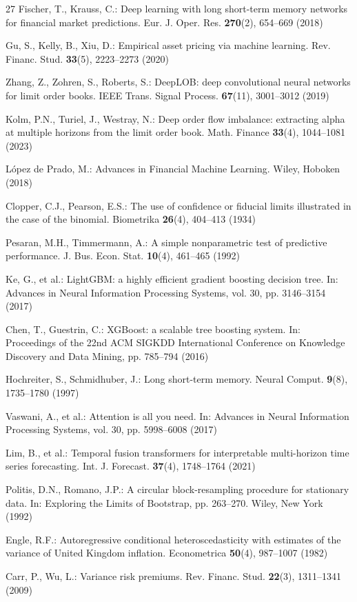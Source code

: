 \documentclass[runningheads]{llncs}
\begin{document}
\begin{thebibliography}{27}
Fischer, T., Krauss, C.: Deep learning with long short-term memory networks for
financial market predictions. Eur. J. Oper. Res. \textbf{270}(2), 654--669
(2018)

Gu, S., Kelly, B., Xiu, D.: Empirical asset pricing via machine learning. Rev.
Financ. Stud. \textbf{33}(5), 2223--2273 (2020)

Zhang, Z., Zohren, S., Roberts, S.: DeepLOB: deep convolutional neural networks
for limit order books. IEEE Trans. Signal Process. \textbf{67}(11), 3001--3012
(2019)

Kolm, P.N., Turiel, J., Westray, N.: Deep order flow imbalance: extracting alpha
at multiple horizons from the limit order book. Math. Finance \textbf{33}(4),
1044--1081 (2023)

L\'opez de Prado, M.: Advances in Financial Machine Learning. Wiley, Hoboken
(2018)

Clopper, C.J., Pearson, E.S.: The use of confidence or fiducial limits
illustrated in the case of the binomial. Biometrika \textbf{26}(4), 404--413
(1934)

Pesaran, M.H., Timmermann, A.: A simple nonparametric test of predictive
performance. J. Bus. Econ. Stat. \textbf{10}(4), 461--465 (1992)

Ke, G., et al.: LightGBM: a highly efficient gradient boosting decision tree. In: Advances in
Neural Information Processing Systems, vol. 30, pp. 3146--3154 (2017)

Chen, T., Guestrin, C.: XGBoost: a scalable tree boosting system. In:
Proceedings of the 22nd ACM SIGKDD International Conference on Knowledge
Discovery and Data Mining, pp. 785--794 (2016)

Hochreiter, S., Schmidhuber, J.: Long short-term memory. Neural Comput.
\textbf{9}(8), 1735--1780 (1997)

Vaswani, A., et al.: Attention is all you need. In: Advances in Neural
Information Processing Systems, vol. 30, pp. 5998--6008 (2017)

Lim, B., et al.: Temporal fusion transformers
for interpretable multi-horizon time series forecasting. Int. J. Forecast.
\textbf{37}(4), 1748--1764 (2021)

Politis, D.N., Romano, J.P.: A circular block-resampling procedure for
stationary data. In: Exploring the Limits of Bootstrap, pp. 263--270. Wiley, New
York (1992)

Engle, R.F.: Autoregressive conditional heteroscedasticity with estimates of the
variance of United Kingdom inflation. Econometrica \textbf{50}(4), 987--1007
(1982)

Carr, P., Wu, L.: Variance risk premiums. Rev. Financ. Stud. \textbf{22}(3),
1311--1341 (2009)
\end{thebibliography}
\end{document}
